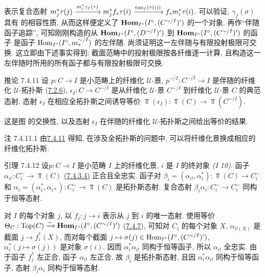 表示复合态射
$m^{\ast}_j\tau(j)\xrightarrow{m_j^{\ast}\gamma_f(\tau)}
m_j^{\ast}f_{\ast}\tau(i)\xrightarrow{\operatorname{can}_f(\tau(i))}
f_{\ast}m^{\ast}_i\tau(i)$.
可以验证, $\gamma_f(\sigma)$ 具有 的相容性质,
从而这样便定义了 $\operatorname{\mathbf{Hom}}_{I^{\circ}}(I^{\circ},(C^{\sim/I})')$ 的一个对象.
再作“伴随函子追踪”, 可知刚刚构造的从
$\operatorname{\mathbf{Hom}}_{I^{\circ}}(I^{\circ},(D^{\sim/I})')$ 到
$\operatorname{\mathbf{Hom}}_{I^{\circ}}(I^{\circ},(C^{\sim/I})')$ 的函子
是函子 $\operatorname{Hom}_{I^{\circ}}(I^{\circ},m^{\sim/I}_{\ast})$ 的左伴随.
尚须证明这一左伴随与有限投射极限可交换.
这立即由下述事实得到: 截面范畴中的投射极限按各纤维逐一计算,
且构造这一左伴随时所用的所有函子都与有限投射极限可交换.

\begin{enonce*}{推论 7.4.11}
设 $p:C\to I$ 是小范畴上的纤维化 $𝒰$-景,
$p^{\sim/I}:C^{\sim/I}\to I$ 是伴随的纤维化 $𝒰$-拓扑斯
(\hyperref[VI.subsubsec7.2.6]{7.2.6}),
$\epsilon_I:C\to C^{\sim/I}$ 是从纤维化 $𝒰$-景 $C^{\sim/I}$
到纤维化 $𝒰$-景 $C$ 的典范态射.
态射 $\epsilon_I$ 在相应全拓扑斯之间诱导等价
$\Top(\epsilon_I):\Top(C)\to\Top(C^{\sim/I})$.
\end{enonce*}

这是图 的交换性,
以及态射 $\epsilon_I$ 在伴随的纤维化 $𝒰$-拓扑斯之间给出等价的结果.

\begin{enonce*}[remark]{注 7.4.11.1}
由\hyperref[VI.cor7.4.11]{7.4.11} 得知,
在涉及全拓扑斯的问题中, 可以将纤维化景换成相应的纤维化拓扑斯.
\end{enonce*}

\begin{enonce*}{引理 7.4.12}
设\pageoriginale $p:C\to I$ 是小范畴 $I$ 上的纤维化景,
$i$ 是 $I$ 的终对象 \emph{(I 10)}.
函子 $\alpha_{i!}:C^{\sim}_i\to\Top(C)$
\hyperlink{sga4.exp.VI.remark.7.4.3.item.4}{(7.4.3.4)} 正合且全忠实.
函子对 $\beta_i=(\alpha_{i!},\alpha^{\ast}_i):\Top(C)\to C^{\sim}_i$ 和
$\alpha_i=(\alpha_i^{\ast},\alpha_{i\ast}):C^{\sim}_i\to\Top(C)$ 是拓扑斯态射.
复合态射 $\beta_i\alpha_i:C^{\sim}_i\to C^{\sim}_i$ 同构于恒等态射.
\end{enonce*}

对 $I$ 的每个对象 $j$, 以 $f_j:j\to i$ 表示从 $j$ 到 $i$ 的唯一态射.
使用等价
$\Theta_C:\operatorname{Top}(C)\xrightarrow{\sim}\operatorname{\mathbf{Hom}}_{I^{\circ}}(I^{\circ},
(C^{\sim/I})')$ (\hyperref[VI.prop7.4.7]{7.4.7}),
可知对 $C_i$ 的每个对象 $X$, $\alpha_{i!(X)}$ 是截面
$j\to f^{\ast}_i(X)$, 而对每个截面
$j\mapsto\sigma(j)\in\operatorname{Hom}_{I^{\circ}}(I^{\circ},(C^{\sim/I})')$,
$\alpha^{\ast}_i(j\mapsto\sigma(j))$ 是对象 $\sigma(i)$.
因而 $\alpha_i^{\ast}\alpha_{i!}$ 同构于恒等函子,
所以 $\alpha_{i!}$ 全忠实.
由于函子 $f_j^{\ast}$ 左正合, 函子 $\alpha_{i!}$ 左正合.
故 $\beta_i$ 是拓扑斯态射,
且因 $\alpha_i^{\ast}\alpha_{i!}$ 同构于恒等函子,
态射 $\beta_i\alpha_i$ 同构于恒等态射.

